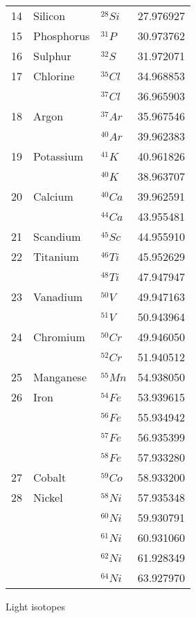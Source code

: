 \begin{margintable}[0pt]
\begin{center}
\begin{tabular}{clll}
      14   & Silicon & ${}^{28}Si$ & 27.976927 \\
      15   & Phosphorus & ${}^{31}P$ & 30.973762 \\
      16   & Sulphur & ${}^{32}S$ & 31.972071 \\
      17   & Chlorine & ${}^{35}Cl$ & 34.968853 \\
      & & ${}^{37}Cl$ & 36.965903 \\
      18   & Argon & ${}^{37}Ar$ & 35.967546 \\
      &  & ${}^{40}Ar$ & 39.962383 \\
      19   & Potassium & ${}^{41}K$ & 40.961826 \\
      & & ${}^{40}K$ & 38.963707 \\
      20   & Calcium & ${}^{40}Ca$ & 39.962591 \\
      & & ${}^{44}Ca$ & 43.955481 \\
      21   & Scandium & ${}^{45}Sc$ & 44.955910 \\
      22  & Titanium & ${}^{46}Ti$ & 45.952629 \\
      &  & ${}^{48}Ti$ & 47.947947 \\
      23   & Vanadium & ${}^{50}V$ & 49.947163 \\
      & & ${}^{51}V$ & 50.943964 \\
      24   & Chromium & ${}^{50}Cr$ & 49.946050 \\
      &  & ${}^{52}Cr$ & 51.940512 \\
      25   & Manganese & ${}^{55}Mn$ & 54.938050 \\
      26   & Iron & ${}^{54}Fe$ & 53.939615 \\
      & & ${}^{56}Fe$ & 55.934942 \\
      & & ${}^{57}Fe$ & 56.935399 \\
      & & ${}^{58}Fe$ & 57.933280 \\
      27   & Cobalt & ${}^{59}Co$ & 58.933200 \\
      28   & Nickel & ${}^{58}Ni$ & 57.935348 \\ 
      & &${}^{60}Ni$ & 59.930791 \\ 
      & &${}^{61}Ni$ & 60.931060 \\ 
      & &${}^{62}Ni$ & 61.928349 \\ 
      & &${}^{64}Ni$ & 63.927970 \\    
      \bottomrule
    \end{tabular}
  \end{center}
  \caption{Light isotopes}
  \label{tab:font-sizes}
\end{margintable}

